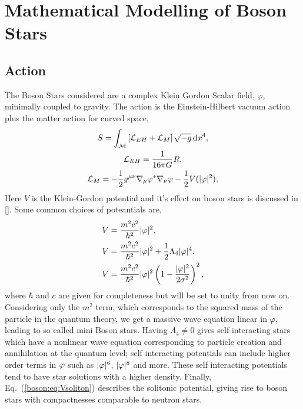 





\section{Mathematical Modelling of Boson Stars}
\subsection{Action}
The Boson Stars considered are a complex Klein Gordon Scalar field, $\varphi$, minimally coupled to gravity. The action is the Einstein-Hilbert vacuum action plus the matter action for curved space,
\begin{gather} S = \int_\mathcal{M}\left[\mathcal{L}_{EH} + \mathcal{L}_M\right] \sqrt{-g}\,\dd x^4, \\
 \mathcal{L}_{EH} = \frac{1}{16\pi G}R, \\
 \mathcal{L}_{M} =-\frac{1}{2}g^{\mu\nu}\nabla_\mu \varphi^* \nabla_\nu \varphi - \frac{1}{2}V(|\varphi|^2),  \end{gather}
Here $V$ is the Klein-Gordon potential and it's effect on boson stars is discussed in []. Some common choices of poteantials are,
\begin{align}
V &= \frac{m^2 c^2}{\hbar^2 }|\varphi|^2,\\
V &= \frac{m^2 c^2}{\hbar^2 }|\varphi|^2 + \frac{1}{2}\Lambda_4|\varphi|^4 ,\\
V &= \frac{m^2 c^2}{\hbar^2 }|\varphi|^2\left(1-\frac{|\varphi|^2}{2\sigma^2}\right)^2 , \label{boson:eq:Vsoliton}
\end{align}
where $\hbar$ and $c$ are given for completeness but will be set to unity from now on.
Considering only the $m^2$ term, which corresponds to the squared mass of the particle in the quantum theory, we get a massive wave equation linear in $\varphi$, leading to so called mini Boson stars. Having $\Lambda_4\neq0$ gives self-interacting stars which have a nonlinear wave equation corresponding to particle creation and annihilation at the quantum level; self interacting potentials can include higher order terms in $\varphi$ such as $|\varphi|^6$, $|\varphi|^8$ and more. These self interacting potentials tend to have star solutions with a higher density. Finally, Eq.~(\ref{boson:eq:Vsoliton}) describes the solitonic potential, giving rise to boson stars with compactnesses comparable to neutron stars. 

